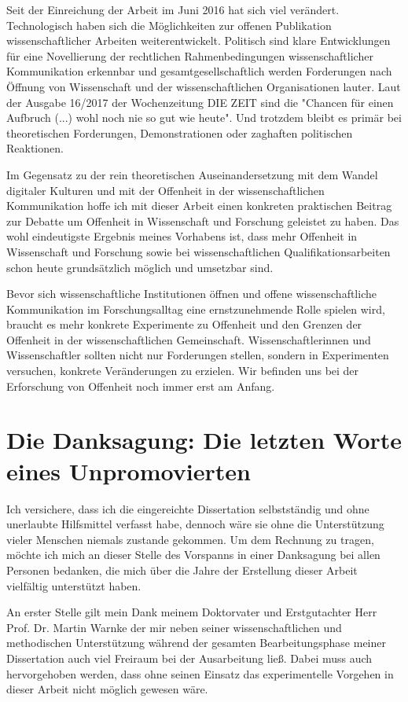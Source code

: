 Seit der Einreichung der Arbeit im Juni 2016 hat sich viel verändert. Technologisch haben sich die Möglichkeiten zur offenen Publikation wissenschaftlicher Arbeiten weiterentwickelt. Politisch sind klare Entwicklungen für eine Novellierung der rechtlichen Rahmenbedingungen wissenschaftlicher Kommunikation erkennbar und gesamtgesellschaftlich werden Forderungen nach Öffnung von Wissenschaft und der wissenschaftlichen Organisationen lauter. Laut der Ausgabe 16/2017 der Wochenzeitung DIE ZEIT sind die "Chancen für einen Aufbruch (...) wohl noch nie so gut wie heute". Und trotzdem bleibt es primär bei theoretischen Forderungen, Demonstrationen oder zaghaften politischen Reaktionen.

Im Gegensatz zu der rein theoretischen Auseinandersetzung mit dem Wandel digitaler Kulturen und mit der Offenheit in der wissenschaftlichen Kommunikation hoffe ich mit dieser Arbeit einen konkreten praktischen Beitrag zur Debatte um Offenheit in Wissenschaft und Forschung geleistet zu haben. Das wohl eindeutigste Ergebnis meines Vorhabens ist, dass mehr Offenheit in Wissenschaft und Forschung sowie bei wissenschaftlichen Qualifikationsarbeiten schon heute grundsätzlich möglich und umsetzbar sind.

Bevor sich wissenschaftliche Institutionen öffnen und offene wissenschaftliche Kommunikation im Forschungsalltag eine ernstzunehmende Rolle spielen wird, braucht es mehr konkrete Experimente zu Offenheit und den Grenzen der Offenheit in der wissenschaftlichen Gemeinschaft. Wissenschaftlerinnen und Wissenschaftler sollten nicht nur Forderungen stellen, sondern in Experimenten versuchen, konkrete Veränderungen zu erzielen. Wir befinden uns bei der Erforschung von Offenheit noch immer erst am Anfang.

\section{Die Danksagung: Die letzten Worte eines Unpromovierten}

Ich versichere, dass ich die eingereichte Dissertation selbstständig und ohne unerlaubte Hilfsmittel verfasst habe, dennoch wäre sie ohne die Unterstützung vieler Menschen niemals zustande gekommen. Um dem Rechnung zu tragen, möchte ich mich an dieser Stelle des Vorspanns in einer Danksagung bei allen Personen bedanken, die mich über die Jahre der Erstellung dieser Arbeit vielfältig unterstützt haben.

An erster Stelle gilt mein Dank meinem Doktorvater und Erstgutachter Herr Prof. Dr. Martin Warnke der mir neben seiner wissenschaftlichen und methodischen Unterstützung während der gesamten Bearbeitungsphase meiner Dissertation auch viel Freiraum bei der Ausarbeitung ließ. Dabei muss auch hervorgehoben werden, dass ohne seinen Einsatz das experimentelle Vorgehen in dieser Arbeit nicht möglich gewesen wäre.

